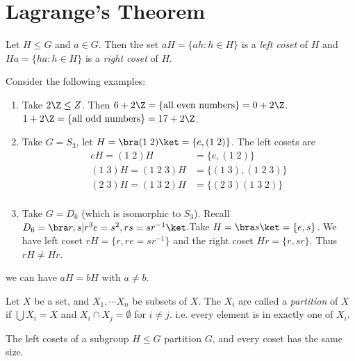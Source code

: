 \documentclass[a4paper]{article}
\begin{document}
  \section{Lagrange's Theorem}
  \begin{defi}[Cosets]
    Let $H\leq G$ and $a\in G$. Then the set $aH =\{ah : h\in H\}$ is a \emph{left coset} of $H$  and $Ha = \{ha : h\in H\}$ is a \emph{right coset} of $H$.
  \end{defi}
  \begin{eg}
    Consider the following examples: 
    \begin{enumerate}
      \item Take $2\Z \leq Z$. Then $6 + 2\Z = \{\text{all even numbers}\} = 0 + 2\Z$. $1 + 2\Z = \{\text{all odd numbers}\} = 17 + 2\Z$. 
      \item Take $G = S_3$, let $H = \bra (1\; 2)\ket = \{e, (1\; 2)\}$. The left cosets are 
        \begin{align*}
          eH = (1\; 2)H &= \{e, (1\; 2)\}\\
          (1\; 3)H = (1\; 2\; 3)H &= \{(1\; 3), (1\; 2\; 3)\}\\
          (2\; 3)H = (1\; 3\; 2)H &= \{(2\; 3)(1\; 3\; 2)\}\\
        \end{align*}
      \item Take $G = D_6$ (which is isomorphic to $S_3$). Recall $D_6 = \bra r, s | r^3 e = s^2, rs = sr^{-1}\ket$.Take $H = \bra s\ket = \{e, s\}$. We have left coset $rH = \{r, re = sr^{-1}\}$ and the right coset $Hr = \{r, sr\}$. Thus $rH \not= Hr$. 
    \end{enumerate}
  \end{eg}
  \note we can have $aH = bH$ with $a\not= b$. 

  \begin{defi}[Partition]
    Let $X$ be a set, and $X_1, \cdots X_n$ be subsets of $X$. The $X_i$ are called a \emph{partition} of $X$ if $\bigcup X_i = X$ and $X_i\cap X_j = \emptyset$ for $i\not= j$. i.e. every element is in exactly one of $X_i$.
  \end{defi}

  \begin{lemma}
    The left cosets of a subgroup $H\leq G$ partition $G$, and every coset has the same size.
  \end{lemma}
\end{document}
